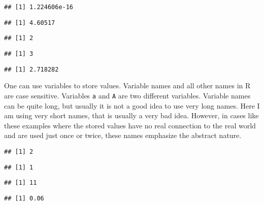 \documentclass[paper=a4,10pt,div=17,headsepline,BCOR=12mm,twoside,open=right]{scrbook}\usepackage{knitr}
\begin{document}
\begin{knitrout}
\begin{kframe}
\begin{verbatim}
## [1] 1.224606e-16
\end{verbatim}
\begin{alltt}
\hlstd{(}\hlstd{)}
\end{alltt}
\begin{verbatim}
## [1] 4.60517
\end{verbatim}
\begin{alltt}
\hlstd{(}\hlstd{)}
\end{alltt}
\begin{verbatim}
## [1] 2
\end{verbatim}
\begin{alltt}
\hlstd{(}\hlstd{)}
\end{alltt}
\begin{verbatim}
## [1] 3
\end{verbatim}
\begin{alltt}
\hlstd{(}\hlstd{)}
\end{alltt}
\begin{verbatim}
## [1] 2.718282
\end{verbatim}
\end{kframe}
\end{knitrout}

One can use variables to store values. Variable names and all other names in R are case sensitive. Variables \texttt{a} and \texttt{A} are two different variables. Variable names can be quite long, but usually it is not a good idea to use very long names. Here I am using very short names, that is usually a very bad idea. However, in cases like these examples where the stored values have no real connection to the real world and are used just once or twice, these names emphasize the abstract nature.


\begin{knitrout}\footnotesize
{}\color{fgcolor}\begin{kframe}
\begin{alltt}
 \hlkwb{<-} 
 \hlopt{+} 
\end{alltt}
\begin{verbatim}
## [1] 2
\end{verbatim}
\begin{alltt}
\end{alltt}
\begin{verbatim}
## [1] 1
\end{verbatim}
\begin{alltt}
 \hlkwb{<-} 
 \hlkwb{<-}  \hlopt{+} 
\end{alltt}
\begin{verbatim}
## [1] 11
\end{verbatim}
\begin{alltt}
 \hlopt{*} 
\end{alltt}
\begin{verbatim}
## [1] 0.06
\end{verbatim}
\end{kframe}
\end{knitrout}
\end{document}
